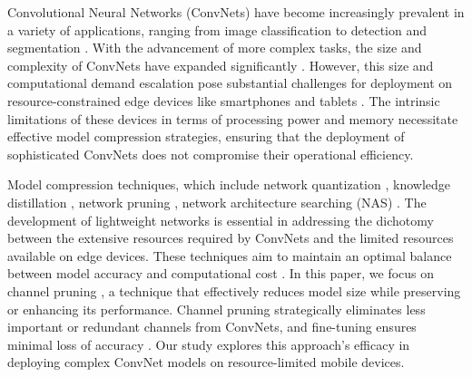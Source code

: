 \documentclass[sigconf, 10pt]{acmart}
\begin{document}
Convolutional Neural Networks (ConvNets) have become increasingly prevalent in a variety of applications, ranging from image classification \cite{2016Deep,2014Very,2016Densely} to detection \cite{2015SSD,2016You,2017Focal,2017Mask} and segmentation \cite{2021INet,2017SegNet,2019Evaluation}. With the advancement of more complex tasks, the size and complexity of ConvNets have expanded significantly \cite{1}. However, this size and computational demand escalation pose substantial challenges for deployment on resource-constrained edge devices like smartphones and tablets \cite{2,2018ShuffleNet}. The intrinsic limitations of these devices in terms of processing power and memory necessitate effective model compression strategies, ensuring that the deployment of sophisticated ConvNets does not compromise their operational efficiency.

Model compression techniques, which include network quantization \cite{3,4,5,6}, knowledge distillation \cite{7}, network pruning \cite{9,10}, network architecture searching (NAS) \cite{11, tan2019efficientnet}. The development of lightweight networks \cite{13,14,15,16} is essential in addressing the dichotomy between the extensive resources required by ConvNets and the limited resources available on edge devices. These techniques aim to maintain an optimal balance between model accuracy and computational cost \cite{17}. In this paper, we focus on channel pruning \cite{lin2021channel,22,24}, a technique that effectively reduces model size while preserving or enhancing its performance. Channel pruning strategically eliminates less important or redundant channels from ConvNets, and fine-tuning ensures minimal loss of accuracy \cite{22,2}. Our study explores this approach's efficacy in deploying complex ConvNet models on resource-limited mobile devices.
\end{document}
